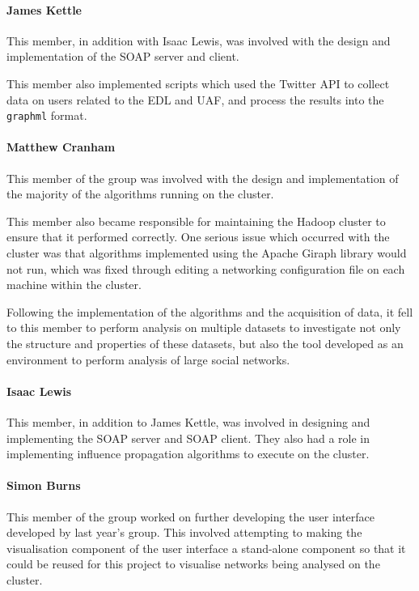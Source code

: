 \paragraph{James Kettle}
This member, in addition with Isaac Lewis, was involved with the design and implementation of the SOAP server and client.

This member also implemented scripts which used the Twitter API to collect data on users related to the EDL and UAF, and process the results into the \verb/graphml/ format.

\paragraph{Matthew Cranham}
This member of the group was involved with the design and implementation of the majority of the algorithms running on the cluster. 

This member also became responsible for maintaining the Hadoop cluster to ensure that it performed correctly. One serious issue which occurred with the cluster was that algorithms implemented using the Apache Giraph library would not run, which was fixed through editing a networking configuration file on each machine within the cluster.

Following the implementation of the algorithms and the acquisition of data, it fell to this member to perform analysis on multiple datasets to investigate not only the structure and properties of these datasets, but also the tool developed as an environment to perform analysis of large social networks.

\paragraph{Isaac Lewis}
This member, in addition to James Kettle, was involved in designing and implementing the SOAP server and SOAP client. They also had a role in implementing influence propagation algorithms to execute on the cluster.

\paragraph{Simon Burns}
This member of the group worked on further developing the user interface developed by last year's group. This involved attempting to making the visualisation component of the user interface a stand-alone component so that it could be reused for this project to visualise networks being analysed on the cluster.